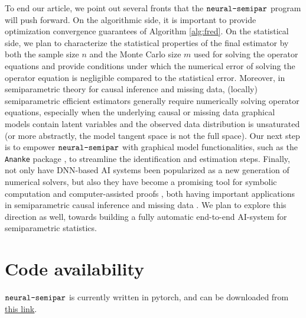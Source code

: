 \documentclass[11pt]{article}
\def\neurosemi{{\normalfont\texttt{neural-semipar}}}
\begin{document}
To end our article, we point out several fronts that the $\neurosemi$ program will push forward. On the algorithmic side, it is important to provide optimization convergence guarantees of Algorithm \ref{alg:fred}. On the statistical side, we plan to characterize the statistical properties of the final estimator by both the sample size $n$ and the Monte Carlo size $m$ used for solving the operator equations and provide conditions under which the numerical error of solving the operator equation is negligible compared to the statistical error. Moreover, in semiparametric theory for causal inference and missing data, (locally) semiparametric efficient estimators generally require numerically solving operator equations, especially when the underlying causal or missing data graphical models contain latent variables \citep{shpitser2014introduction, shpitser2012parameter, mohan2014graphical, evans2016graphs, bhattacharya2020identification, nabi2020full, mohan2021graphical, nabi2022causal, richardson2023nested} and the observed data distribution is unsaturated \citep{liu2021efficient} (or more abstractly, the model tangent space is not the full space). Our next step is to empower $\neurosemi$ with graphical model functionalities, such as the \texttt{Ananke} package \citep{lee2023ananke}, to streamline the identification and estimation steps. Finally, not only have DNN-based AI systems been popularized as a new generation of numerical solvers, but also they have become a promising tool for symbolic computation \citep{lamb2021graph, chen2022linear, chen2022mi} and computer-assisted proofs \citep{loos2017deep, davies2021advancing, chen2022stable}, both having important applications in semiparametric causal inference and missing data \citep{balke1994counterfactual, shpitser2014introduction, frangakis2015deductive, carone2019toward, sachs2022general}. We plan to explore this direction as well, towards building a fully automatic end-to-end AI-system for semiparametric statistics.

\section{Code availability}
\label{sec:code}

$\neurosemi$ is currently written in pytorch, and can be downloaded from \href{https://linliu-stats.github.io/}{\underline{this link}}.

\end{document}
